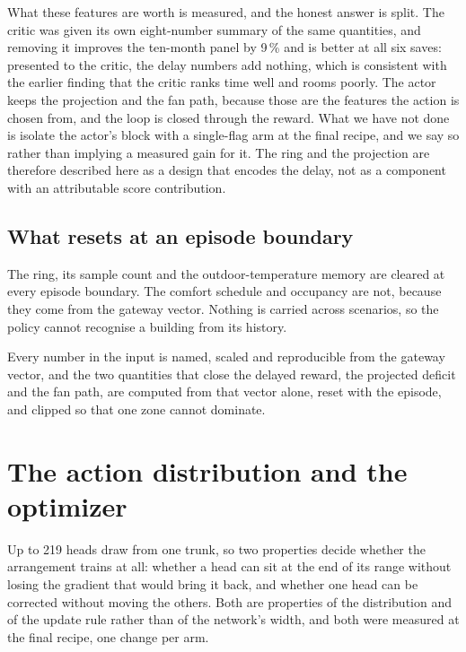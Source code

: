 \documentclass{article}
\begin{document}
What these features are worth is measured, and the honest answer is split. The critic was given its own eight-number summary of the same quantities, and removing it improves the ten-month panel by 9\,\% and is better at all six saves: presented to the critic, the delay numbers add nothing, which is consistent with the earlier finding that the critic ranks time well and rooms poorly. The actor keeps the projection and the fan path, because those are the features the action is chosen from, and the loop is closed through the reward. What we have not done is isolate the actor's block with a single-flag arm at the final recipe, and we say so rather than implying a measured gain for it. The ring and the projection are therefore described here as a design that encodes the delay, not as a component with an attributable score contribution.

\subsection{What resets at an episode boundary}
\label{app:reset}

The ring, its sample count and the outdoor-temperature memory are cleared at every episode boundary. The comfort schedule and occupancy are not, because they come from the gateway vector. Nothing is carried across scenarios, so the policy cannot recognise a building from its history.

Every number in the input is named, scaled and reproducible from the gateway vector, and the two quantities that close the delayed reward, the projected deficit and the fan path, are computed from that vector alone, reset with the episode, and clipped so that one zone cannot dominate.

\section{The action distribution and the optimizer}
\label{app:action}

Up to 219 heads draw from one trunk, so two properties decide whether the arrangement trains at all: whether a head can sit at the end of its range without losing the gradient that would bring it back, and whether one head can be corrected without moving the others. Both are properties of the distribution and of the update rule rather than of the network's width, and both were measured at the final recipe, one change per arm.
\end{document}
